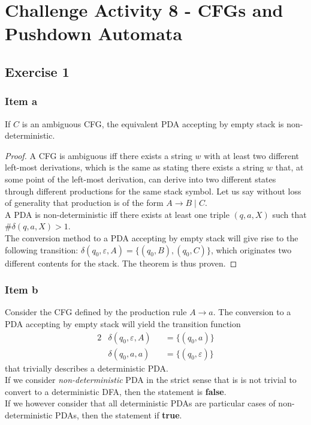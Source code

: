 \setcounter{section}{7}
\section{Challenge Activity 8 - CFGs and Pushdown Automata}
\subsection{Exercise 1}%
{
\renewcommand{\thesubsubsection}{\thesubsection\alph{subsubsection}}
\subsubsection{Item a}
\begin{theorem}
If $C$ is an ambiguous CFG, the equivalent PDA accepting by empty stack is non-deterministic.
\end{theorem}
\begin{proof}
A CFG is ambiguous iff there exists a string $w$ with at least two different left-most derivations, which is the same as stating there exists a string $w$ that, at some point of the left-most derivation, can derive into two different states through different productions for the same stack symbol. Let us say without loss of generality that production is of the form $A \rightarrow B\mid C$.\\
A PDA is non-deterministic iff there exists at least one triple $(q,a,X)$ such that $\#\delta(q, a, X) > 1$.\\
The conversion method to a PDA accepting by empty stack will give rise to the following transition: $\delta(q_0, \varepsilon, A)=\{(q_0,B),(q_0,C)\}$, which originates two different contents for the stack. The theorem is thus proven.
\end{proof}
\subsubsection{Item b}
Consider the CFG defined by the production rule $A \rightarrow a$. The conversion to a PDA accepting by empty stack will yield the transition function
\begin{alignat*}{2}
	&\delta(q_0,\varepsilon,A) &&= \{(q_0, a)\}\\
	&\delta(q_0,a          ,a) &&= \{(q_0, \varepsilon)\} 
\end{alignat*}
that trivially describes a deterministic PDA.\\
If we consider \textit{non-deterministic} PDA in the strict sense that is is not trivial to convert to a deterministic DFA, then the statement is \textbf{false}.\\
If we however consider that all deterministic PDAs are particular cases of non-deterministic PDAs, then the statement if \textbf{true}.
}
